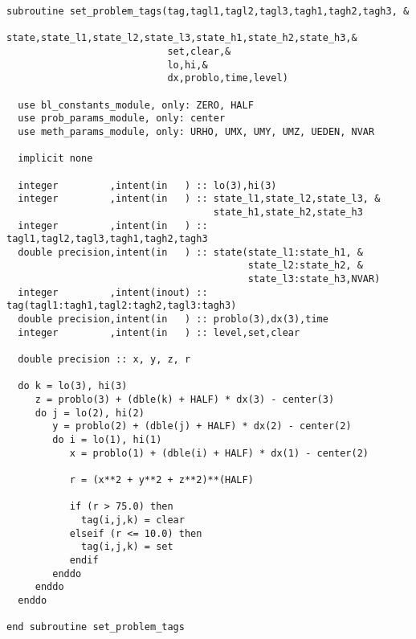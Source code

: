 \begin{verbatim}
subroutine set_problem_tags(tag,tagl1,tagl2,tagl3,tagh1,tagh2,tagh3, &
                            state,state_l1,state_l2,state_l3,state_h1,state_h2,state_h3,&
                            set,clear,&
                            lo,hi,&
                            dx,problo,time,level)

  use bl_constants_module, only: ZERO, HALF
  use prob_params_module, only: center
  use meth_params_module, only: URHO, UMX, UMY, UMZ, UEDEN, NVAR
 
  implicit none
  
  integer         ,intent(in   ) :: lo(3),hi(3)
  integer         ,intent(in   ) :: state_l1,state_l2,state_l3, &
                                    state_h1,state_h2,state_h3
  integer         ,intent(in   ) :: tagl1,tagl2,tagl3,tagh1,tagh2,tagh3
  double precision,intent(in   ) :: state(state_l1:state_h1, &
                                          state_l2:state_h2, &
                                          state_l3:state_h3,NVAR)
  integer         ,intent(inout) :: tag(tagl1:tagh1,tagl2:tagh2,tagl3:tagh3)
  double precision,intent(in   ) :: problo(3),dx(3),time
  integer         ,intent(in   ) :: level,set,clear

  double precision :: x, y, z, r

  do k = lo(3), hi(3)
     z = problo(3) + (dble(k) + HALF) * dx(3) - center(3)
     do j = lo(2), hi(2)
        y = problo(2) + (dble(j) + HALF) * dx(2) - center(2)
        do i = lo(1), hi(1)
           x = problo(1) + (dble(i) + HALF) * dx(1) - center(2)

           r = (x**2 + y**2 + z**2)**(HALF)

           if (r > 75.0) then
             tag(i,j,k) = clear
           elseif (r <= 10.0) then
             tag(i,j,k) = set
           endif
        enddo
     enddo
  enddo
  
end subroutine set_problem_tags
\end{verbatim}

